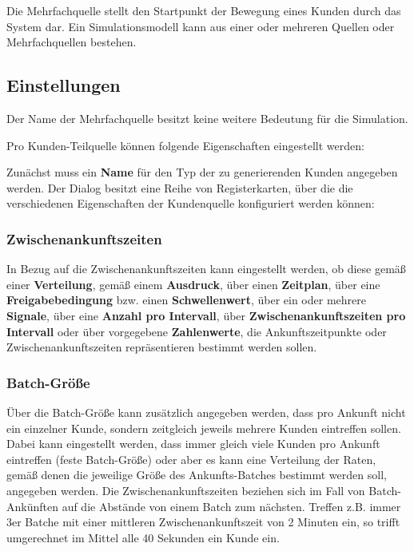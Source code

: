 Die Mehrfachquelle stellt den Startpunkt der Bewegung eines Kunden durch das System dar.
Ein Simulationsmodell kann aus einer oder mehreren Quellen oder Mehrfachquellen bestehen.

\subsection*{Einstellungen}

Der Name der Mehrfachquelle besitzt keine weitere Bedeutung für die Simulation.

Pro Kunden-Teilquelle können folgende Eigenschaften eingestellt werden: 

Zunächst muss ein \textbf{Name} für den Typ der zu generierenden Kunden angegeben werden.
Der Dialog besitzt eine Reihe von Registerkarten, über die die verschiedenen Eigenschaften
der Kundenquelle konfiguriert werden können:

\subsubsection*{Zwischenankunftszeiten}

In Bezug auf die Zwischenankunftszeiten kann eingestellt werden, ob diese gemäß einer
\textbf{Verteilung}, gemäß einem \textbf{Ausdruck}, über einen \textbf{Zeitplan}, über eine
\textbf{Freigabebedingung} bzw. einen \textbf{Schwellenwert}, über ein oder mehrere
\textbf{Signale}, über eine \textbf{Anzahl pro Intervall}, über \textbf{Zwischenankunftszeiten pro Intervall}
oder über vorgegebene \textbf{Zahlenwerte}, die Ankunftszeitpunkte oder Zwischenankunftszeiten
repräsentieren bestimmt werden sollen.

\subsubsection*{Batch-Größe}

Über die Batch-Größe kann zusätzlich
angegeben werden, dass pro Ankunft nicht ein einzelner Kunde, sondern zeitgleich jeweils
mehrere Kunden eintreffen sollen. Dabei kann eingestellt werden, dass immer gleich
viele Kunden pro Ankunft eintreffen (feste Batch-Größe) oder aber es kann eine Verteilung
der Raten, gemäß denen die jeweilige Größe des Ankunfts-Batches bestimmt werden soll,
angegeben werden.
Die Zwischenankunftszeiten beziehen sich im Fall von Batch-Ankünften auf die Abstände von
einem Batch zum nächsten. Treffen z.B. immer 3er Batche mit einer mittleren Zwischenankunftszeit
von 2 Minuten ein, so trifft umgerechnet im Mittel alle 40 Sekunden ein Kunde ein.

